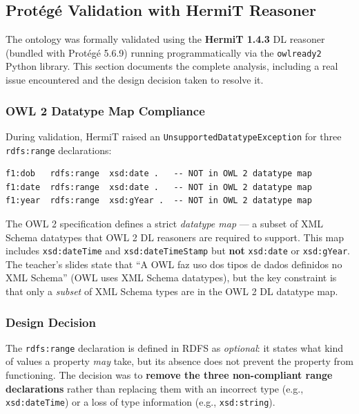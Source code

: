 \documentclass[12pt,a4paper]{article}
\begin{document}
\subsection{Protégé Validation with HermiT Reasoner}
\label{sec:hermit}

The ontology was formally validated using the \textbf{HermiT 1.4.3} DL reasoner
(bundled with Protégé 5.6.9) running programmatically via the \texttt{owlready2}
Python library. This section documents the complete analysis, including a real
issue encountered and the design decision taken to resolve it.

\subsubsection{OWL 2 Datatype Map Compliance}

During validation, HermiT raised an \texttt{UnsupportedDatatypeException} for three
\texttt{rdfs:range} declarations:

\begin{lstlisting}[style=turtle, caption={Original range declarations causing HermiT rejection}]
f1:dob   rdfs:range  xsd:date .   -- NOT in OWL 2 datatype map
f1:date  rdfs:range  xsd:date .   -- NOT in OWL 2 datatype map
f1:year  rdfs:range  xsd:gYear .  -- NOT in OWL 2 datatype map
\end{lstlisting}

The OWL 2 specification defines a strict \emph{datatype map} --- a subset of XML
Schema datatypes that OWL 2 DL reasoners are required to support. This map includes
\texttt{xsd:dateTime} and \texttt{xsd:dateTimeStamp} but \textbf{not}
\texttt{xsd:date} or \texttt{xsd:gYear}. The teacher's slides state that
``A OWL faz uso dos tipos de dados definidos no XML Schema'' (OWL uses XML Schema
datatypes), but the key constraint is that only a \emph{subset} of XML Schema
types are in the OWL 2 DL datatype map.

\subsubsection{Design Decision}

The \texttt{rdfs:range} declaration is defined in RDFS as \emph{optional}: it
states what kind of values a property \emph{may} take, but its absence does not
prevent the property from functioning. The decision was to
\textbf{remove the three non-compliant range declarations} rather than replacing
them with an incorrect type (e.g., \texttt{xsd:dateTime}) or a loss of type
information (e.g., \texttt{xsd:string}).
\end{document}
